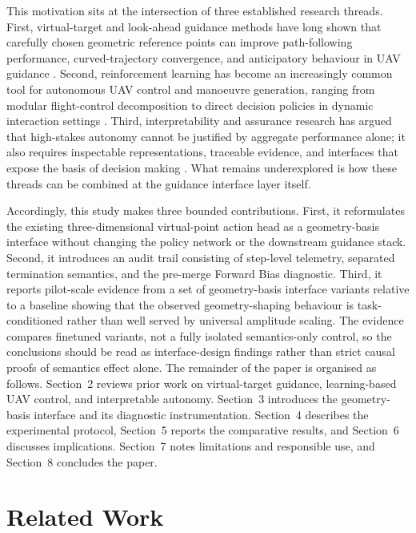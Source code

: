 \documentclass[drones,article,submit,pdftex,moreauthors]{Definitions/mdpi}
\begin{document}
This motivation sits at the intersection of three established research threads. First, virtual-target and look-ahead guidance methods have long shown that carefully chosen geometric reference points can improve path-following performance, curved-trajectory convergence, and anticipatory behaviour in UAV guidance \cite{park2007,ratnoo2015,breivik2005}. Second, reinforcement learning has become an increasingly common tool for autonomous UAV control and manoeuvre generation, ranging from modular flight-control decomposition to direct decision policies in dynamic interaction settings \cite{choi2023,quan2026,wang2023aerospace}. Third, interpretability and assurance research has argued that high-stakes autonomy cannot be justified by aggregate performance alone; it also requires inspectable representations, traceable evidence, and interfaces that expose the basis of decision making \cite{glanois2024,paterson2025,paleja2022}. What remains underexplored is how these threads can be combined at the guidance interface layer itself.

Accordingly, this study makes three bounded contributions. First, it reformulates the existing three-dimensional virtual-point action head as a geometry-basis interface without changing the policy network or the downstream guidance stack. Second, it introduces an audit trail consisting of step-level telemetry, separated termination semantics, and the pre-merge Forward Bias diagnostic. Third, it reports pilot-scale evidence from a set of geometry-basis interface variants relative to a baseline showing that the observed geometry-shaping behaviour is task-conditioned rather than well served by universal amplitude scaling. The evidence compares finetuned variants, not a fully isolated semantics-only control, so the conclusions should be read as interface-design findings rather than strict causal proofs of semantics effect alone. The remainder of the paper is organised as follows. Section~2 reviews prior work on virtual-target guidance, learning-based UAV control, and interpretable autonomy. Section~3 introduces the geometry-basis interface and its diagnostic instrumentation. Section~4 describes the experimental protocol, Section~5 reports the comparative results, and Section~6 discusses implications. Section~7 notes limitations and responsible use, and Section~8 concludes the paper.

\section{Related Work}
\end{document}
